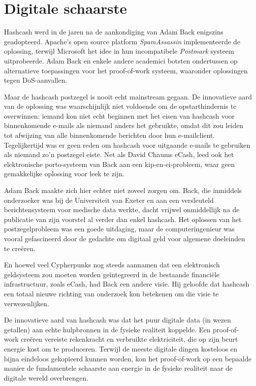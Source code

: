 \documentclass[
  a5paper,
  smalldemyvopaper,11pt,twoside,onecolumn,openright,extrafontsizes,
hidelinks]{memoir}
\begin{document}
\section{Digitale schaarste}\label{digitale-schaarste}

Hashcash werd in de jaren na de aankondiging van Adam Back enigszins
geadopteerd. Apache's open source platform \emph{SpamAssassin}
implementeerde de oplossing, terwijl Microsoft het idee in hun
incompatibele \emph{Postmark} systeem uitprobeerde. Adam Back en enkele
andere academici botsten ondertussen op alternatieve toepassingen voor
het proof-of-work systeem, waaronder oplossingen tegen DoS-aanvallen.

Maar de hashcash postzegel is nooit echt mainstream gegaan. De
innovatieve aard van de oplossing was waarschijnlijk niet voldoende om
de opstarthindernis te overwinnen: iemand kon niet echt beginnen met het
eisen van hashcash voor binnenkomende e-mails als niemand anders het
gebruikte, omdat dit zou leiden tot afwijzing van alle binnenkomende
berichten door hun e-mailclient. Tegelijkertijd was er geen reden om
hashcash voor uitgaande e-mails te gebruiken als niemand zo'n postzegel
eiste. Net als David Chaums eCash, leed ook het elektronische
porto-systeem van Back aan een kip-en-ei-probleem, waar geen
gemakkelijke oplossing voor leek te zijn.

Adam Back maakte zich hier echter niet zoveel zorgen om. Back, die
inmiddels onderzoeker was bij de Universiteit van Exeter en aan een
versleuteld berichtensysteem voor medische data werkte, dacht vrijwel
onmiddellijk na de publicatie van zijn voorstel al verder dan enkel
hashcash. Het oplossen van het postzegelprobleem was een goede
uitdaging, maar de computeringenieur was vooral gefascineerd door de
gedachte om digitaal geld voor algemene doeleinden te creëren.

En hoewel veel Cypherpunks nog steeds aannamen dat een elektronisch
geldsysteem zou moeten worden geïntegreerd in de bestaande financiële
infrastructuur, zoals eCash, had Back een andere visie. Hij geloofde dat
hashcash een totaal nieuwe richting van onderzoek kon betekenen om die
visie te verwezenlijken.

De innovatieve aard van hashcash was dat het puur digitale data (in
wezen getallen) aan echte hulpbronnen in de fysieke realiteit koppelde.
Een proof-of-work creëren vereiste rekenkracht en verbruikte
elektriciteit, die op zijn beurt energie kost om te produceren. Terwijl
de meeste digitale dingen kosteloos en bijna eindeloos gekopieerd kunnen
worden, kon het proof-of-work op een bepaalde manier de fundamentele
schaarste aan energie in de fysieke realiteit naar de digitale wereld
overbrengen.
\end{document}
